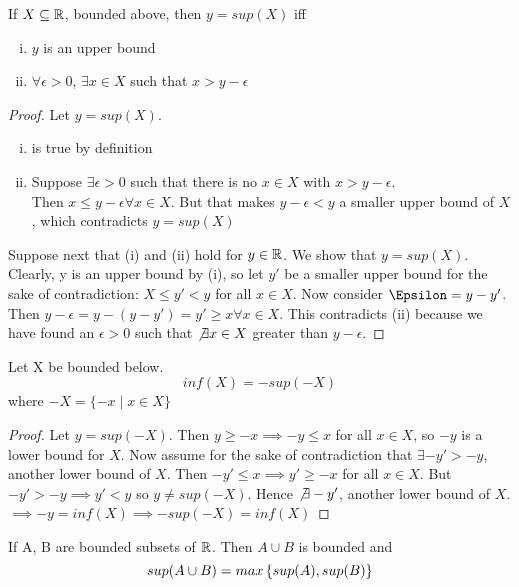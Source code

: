\begin{proposition}
	If $X\subseteq \mathbb{R}$, bounded above, then $y = sup(X)$ iff
	\begin{enumerate}[(i)]
		\item $y$ is an upper bound
		\item $\forall \epsilon > 0$, $\exists x\in X$ such that $x>y-\epsilon$
	\end{enumerate}
\end{proposition}
\begin{proof}
Let $y = sup(X)$. \begin{enumerate}[(i)]
\item is true by definition
\item Suppose $\exists \epsilon > 0$ such that there is no $x\in X$ with $x>y-\epsilon$. \\
Then $x\leq y-\epsilon \forall x\in X$. But that makes $y-\epsilon < y$ a smaller upper bound of $X$, which contradicts $y=sup(X)$
\end{enumerate}

Suppose next that (i) and (ii) hold for $y\in \mathbb{R}$. We show that $y = sup(X)$. Clearly, y is an upper bound by (i), so let $y'$ be a smaller upper bound for the sake of contradiction: $X\leq y' < y$ for all $x\in X$. Now consider $\Epsilon = y-y'$. Then $y-\epsilon = y- (y-y') = y' \geq x \forall x\in X$. This contradicts (ii) because we have found an $\epsilon > 0$ such that $\not \exists x \in X$ greater than $y-\epsilon$.
\end{proof}

\begin{proposition}
	Let X be bounded below.
	\[inf(X) = -sup(-X)\]
	where $-X = \{-x \mid x\in X\}$
\end{proposition}

\begin{proof}
	Let $y = sup (-X)$. Then $y \geq -x \implies -y \leq x$ for all $x\in X$, so $-y$ is a lower bound for $X$. Now assume for the sake of contradiction that $\exists -y' > -y$, another lower bound of $X$. Then $-y' \leq x \implies y' \geq -x$ for all $x\in X$. But $-y' > -y \implies y' < y$ so $y \neq sup(-X)$. Hence $\not \exists -y'$, another lower bound of $X$. $\implies -y = inf(X) \implies -sup(-X) = inf(X)$
\end{proof}

\begin{proposition}\label{1.5}
	If A, B are bounded subsets of $\mathbb{R}$. Then $A\cup B$ is bounded and
	\[sup(A\cup B) = max\left\{ sup(A), sup(B) \right\}\]
\end{proposition}
